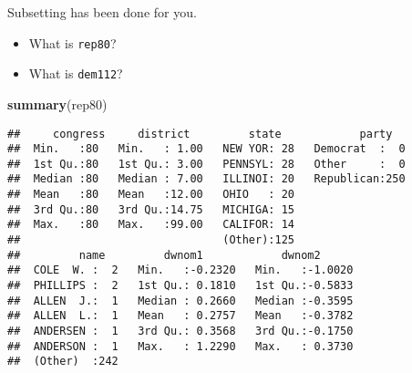 \documentclass[ignorenonframetext,]{beamer}
\newenvironment{Shaded}{\begin{snugshade}}{\end{snugshade}}
\newcommand{\KeywordTok}[1]{\textcolor[rgb]{0.13,0.29,0.53}{\textbf{#1}}}
\newcommand{\NormalTok}[1]{#1}
\providecommand{\tightlist}{%
	\setlength{\itemsep}{0pt}\setlength{\parskip}{0pt}}
\begin{document}
\begin{frame}[fragile]{Subsetting has been done for you.}

\begin{itemize}
\tightlist
\item
  What is \texttt{rep80}?
\item
  What is \texttt{dem112}?
\end{itemize}

\begin{Shaded}
\begin{Highlighting}[]
\KeywordTok{summary}\NormalTok{(rep80)}
\end{Highlighting}
\end{Shaded}

\begin{verbatim}
##     congress     district         state            party    
##  Min.   :80   Min.   : 1.00   NEW YOR: 28   Democrat  :  0  
##  1st Qu.:80   1st Qu.: 3.00   PENNSYL: 28   Other     :  0  
##  Median :80   Median : 7.00   ILLINOI: 20   Republican:250  
##  Mean   :80   Mean   :12.00   OHIO   : 20                   
##  3rd Qu.:80   3rd Qu.:14.75   MICHIGA: 15                   
##  Max.   :80   Max.   :99.00   CALIFOR: 14                   
##                               (Other):125                   
##         name         dwnom1            dwnom2       
##  COLE  W. :  2   Min.   :-0.2320   Min.   :-1.0020  
##  PHILLIPS :  2   1st Qu.: 0.1810   1st Qu.:-0.5833  
##  ALLEN  J.:  1   Median : 0.2660   Median :-0.3595  
##  ALLEN  L.:  1   Mean   : 0.2757   Mean   :-0.3782  
##  ANDERSEN :  1   3rd Qu.: 0.3568   3rd Qu.:-0.1750  
##  ANDERSON :  1   Max.   : 1.2290   Max.   : 0.3730  
##  (Other)  :242
\end{verbatim}

\end{frame}
\end{document}
